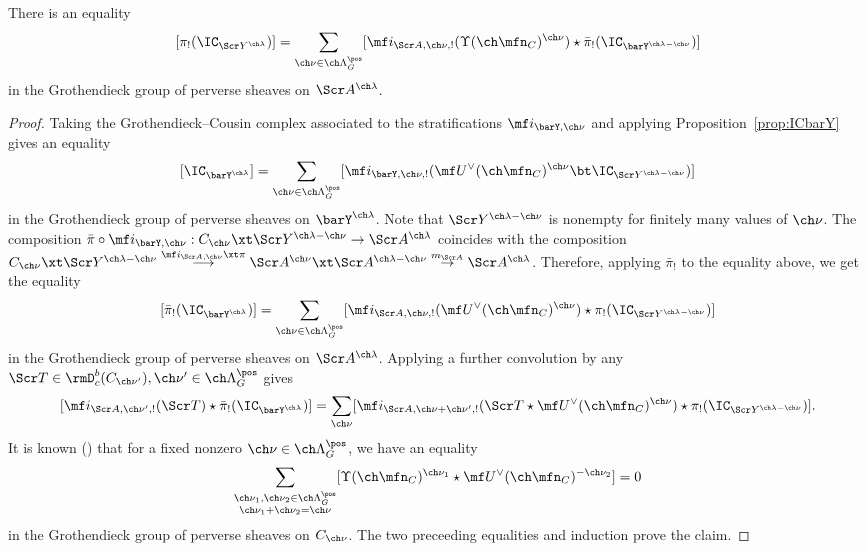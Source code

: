 \begin{cor}
\notready \label{cor:pibarY}
There is an equality
\[ [ \pi_!(\IC_{\Scr Y^{\ch\lambda}}) ] = \sum_{\ch\nu\in \ch\Lambda^\pos_G}
[ \mf i_{\Scr A,\ch\nu,!}(\Upsilon(\ch\mfn_C)^{\ch\nu}) \star \bar\pi_!(\IC_{\barY^{\ch\lambda-\ch\nu}})] \]
in the Grothendieck group of perverse sheaves on $\Scr A^{\ch\lambda}$.
\end{cor}

\begin{proof}
Taking the Grothendieck--Cousin complex associated to the stratifications
$\mf i_{\barY,\ch\nu}$ and applying Proposition~\ref{prop:ICbarY}
gives an equality
\[ [\IC_{\barY^{\ch\lambda}}] = \sum_{\ch\nu \in \ch\Lambda^\pos_G}
[\mf i_{\barY,\ch\nu,!} ( \mf U^\vee(\ch\mfn_C)^{\ch\nu} \bt \IC_{\Scr Y^{\ch\lambda-\ch\nu}} ) ] \]
in the Grothendieck group of perverse sheaves on $\barY^{\ch\lambda}$.
Note that $\Scr Y^{\ch\lambda-\ch\nu}$ is nonempty for finitely many
values of $\ch\nu$.
The composition $\bar\pi \circ \mf i_{\barY,\ch\nu} : C_{\ch\nu} \xt \Scr Y^{\ch\lambda-\ch\nu} \to \Scr A^{\ch\lambda}$ coincides with
the composition $C_{\ch\nu} \xt \Scr Y^{\ch\lambda-\ch\nu} \overset{\mf i_{\Scr A,\ch\nu} \xt \pi}\longrightarrow \Scr A^{\ch\nu} \xt \Scr A^{\ch\lambda-\ch\nu} \overset{m_{\Scr A}}\to \Scr A^{\ch\lambda}$.
Therefore, applying $\bar\pi_!$ to the equality above, we get
the equality
\[ [\bar\pi_!(\IC_{\barY^{\ch\lambda}})] = \sum_{\ch\nu\in \ch\Lambda^\pos_G} [\mf i_{\Scr A,\ch\nu,!}(\mf U^\vee(\ch\mfn_C)^{\ch\nu}) \star \pi_!(\IC_{\Scr Y^{\ch\lambda-\ch\nu}})]  \]
in the Grothendieck group of perverse sheaves on $\Scr A^{\ch\lambda}$.
Applying a further convolution by any $\Scr T \in \rmD^b_c(C_{\ch\nu'}),
\ch\nu'\in \ch\Lambda^\pos_G$
gives
\[ [ \mf i_{\Scr A, \ch\nu',!}( \Scr T ) \star \bar\pi_! (\IC_{\barY^{\ch\lambda}}) ] = \sum_{\ch\nu} [ \mf i_{\Scr A,\ch\nu+\ch\nu',!}( \Scr T \star \mf U^\vee(\ch\mfn_C)^{\ch\nu}) \star \pi_!(\IC_{\Scr Y^{\ch\lambda-\ch\nu}}) ] . \]
It is known (\cite[\S 6.4]{BG2}) that for a fixed nonzero $\ch\nu \in \ch\Lambda^\pos_G$, we have an equality
\[ \sum_{\substack{\ch\nu_1,\ch\nu_2 \in \ch\Lambda^\pos_G\\
\ch\nu_1+\ch\nu_2=\ch\nu}}
[ \Upsilon(\ch\mfn_C)^{\ch\nu_1} \star \mf U^\vee(\ch\mfn_C)^{-\ch\nu_2}  ] = 0 \]
in the Grothendieck group of perverse sheaves on $C_{\ch\nu}$.
The two preceeding equalities and induction prove the claim.
\end{proof}
